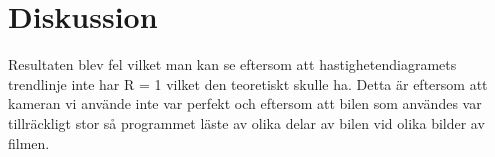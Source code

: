 \documentclass[11p, titlepage, oneside, a4paper]{article}
\begin{document}
    \section{Diskussion} 
    Resultaten blev fel vilket man kan se eftersom att hastighetendiagramets trendlinje inte har R = 1 vilket den teoretiskt skulle ha. Detta är eftersom att kameran vi använde inte var perfekt och eftersom att bilen som användes var tillräckligt stor så programmet läste av olika delar av bilen vid olika bilder av filmen.
    
    \printbibliography
\end{document}
